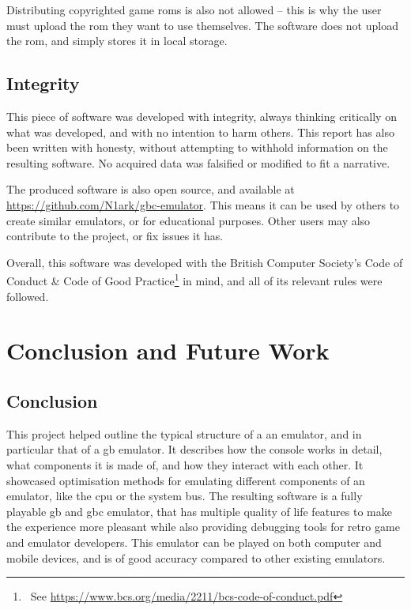 \documentclass[11pt]{informatics-report}
\newcommand{\ftnt}[1]{\footnote{~See \url{#1}}}
\begin{document}
Distributing copyrighted game \glspl{rom} is also not allowed -- this is why the user must upload the \gls{rom} they want to use themselves. The software does not upload the \gls{rom}, and simply stores it in local storage.

\section{Integrity}

This piece of software was developed with integrity, always thinking critically on what was developed, and with no intention to harm others. This report has also been written with honesty, without attempting to withhold information on the resulting software. No acquired data was falsified or modified to fit a narrative.

The produced software is also open source, and available at \url{https://github.com/N1ark/gbc-emulator}. This means it can be used by others to create similar emulators, or for educational purposes. Other users may also contribute to the project, or fix issues it has.

Overall, this software was developed with the British Computer Society's Code of Conduct \& Code of Good Practice\ftnt{https://www.bcs.org/media/2211/bcs-code-of-conduct.pdf} in mind, and all of its relevant rules were followed.

\chapter{Conclusion and Future Work}

\section{Conclusion}

This project helped outline the typical structure of a an emulator, and in particular that of a \glsdesc{gb} emulator. It describes how the console works in detail, what components it is made of, and how they interact with each other. It showcased optimisation methods for emulating different components of an emulator, like the \gls{cpu} or the system bus. The resulting software is a fully playable \glsdesc{gb} and \glsdesc{gbc} emulator, that has multiple quality of life features to make the experience more pleasant while also providing debugging tools for retro game and emulator developers. This emulator can be played on both computer and mobile devices, and is of good accuracy compared to other existing emulators.
\end{document}

